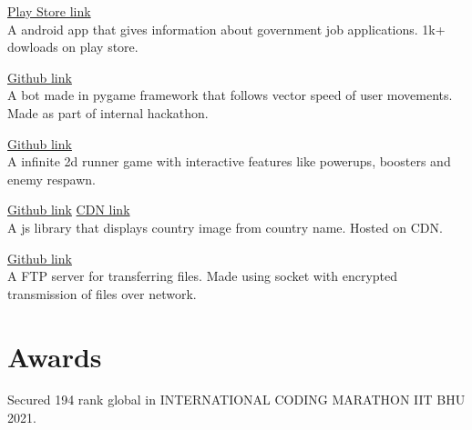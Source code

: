 \documentclass[]{deedy-resume-openfont}
\begin{document}
\begin{minipage}[t]{0.66\textwidth}
\hfill \href{https://play.google.com/store/apps/details?id=com.amostrone.akash.sanjeevwebsolutions}{Play Store link}\\
A android app that gives information about government job applications. 1k+ dowloads on play store.\\
\sectionsep

\hfill \href{https://github.com/jaiakash/spiddysense2021\_Akash}{Github link}\\
A bot made in pygame framework that follows vector speed of user movements. Made as part of internal hackathon.\\
\sectionsep
  

\hfill \href{https://github.com/jaiakash/NinjaVsSal}{Github link}\\
A infinite 2d runner game with interactive features like powerups, boosters and enemy respawn.\\
\sectionsep
  

\hfill \href{https://github.com/jaiakash/countryFlag}{Github link} \href{https://cdn.jsdelivr.net/gh/jaiakash/countryFlag@master/countryFlag.js}{CDN link}\\
A js library that displays country image from country name. Hosted on CDN.\\
\sectionsep
  

\hfill \href{https://github.com/jaiakash/alphaq-file-server}{Github link}\\
A FTP server for transferring files. Made using socket with encrypted transmission of files over network.\\
\sectionsep

%
%
\section{Awards}
 
Secured 194 rank global in INTERNATIONAL CODING MARATHON IIT BHU 2021.\\
 

 

 

 

\sectionsep
\end{minipage} 
\ 
\end{document}
